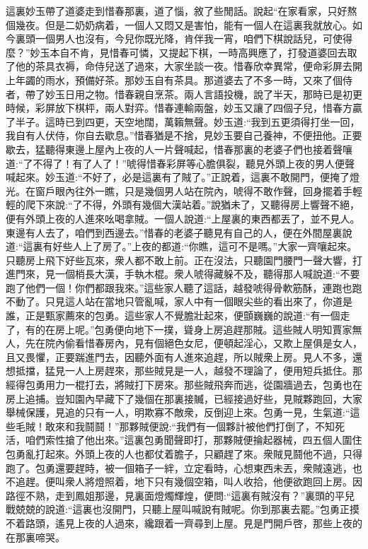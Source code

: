 \begin{parag}
    這裏妙玉帶了道婆走到惜春那裏，道了惱，敘了些閒話。說起“在家看家，只好熬個幾夜。但是二奶奶病着，一個人又悶又是害怕，能有一個人在這裏我就放心。如今裏頭一個男人也沒有，今兒你既光降，肯伴我一宵，咱們下棋說話兒，可使得麼？”妙玉本自不肯，見惜春可憐，又提起下棋，一時高興應了，打發道婆回去取了他的茶具衣褥，命侍兒送了過來，大家坐談一夜。惜春欣幸異常，便命彩屏去開上年蠲的雨水，預備好茶。那妙玉自有茶具。那道婆去了不多一時，又來了個侍者，帶了妙玉日用之物。惜春親自烹茶。兩人言語投機，說了半天，那時已是初更時候，彩屏放下棋枰，兩人對弈。惜春連輸兩盤，妙玉又讓了四個子兒，惜春方贏了半子。這時已到四更，天空地闊，萬籟無聲。妙玉道:“我到五更須得打坐一回，我自有人伏侍，你自去歇息。”惜春猶是不捨，見妙玉要自己養神，不便扭他。正要歇去，猛聽得東邊上屋內上夜的人一片聲喊起，惜春那裏的老婆子們也接着聲嚷道:“了不得了！有了人了！”唬得惜春彩屏等心膽俱裂，聽見外頭上夜的男人便聲喊起來。妙玉道:“不好了，必是這裏有了賊了。”正說着，這裏不敢開門，便掩了燈光。在窗戶眼內往外一瞧，只是幾個男人站在院內，唬得不敢作聲，回身擺着手輕輕的爬下來說:“了不得，外頭有幾個大漢站着。”說猶未了，又聽得房上響聲不絕，便有外頭上夜的人進來吆喝拿賊。一個人說道:“上屋裏的東西都丟了，並不見人。東邊有人去了，咱們到西邊去。”惜春的老婆子聽見有自己的人，便在外間屋裏說道:“這裏有好些人上了房了。”上夜的都道:“你瞧，這可不是嗎。”大家一齊嚷起來。只聽房上飛下好些瓦來，衆人都不敢上前。正在沒法，只聽園門腰門一聲大響，打進門來，見一個梢長大漢，手執木棍。衆人唬得藏躲不及，聽得那人喊說道:“不要跑了他們一個！你們都跟我來。”這些家人聽了這話，越發唬得骨軟筋酥，連跑也跑不動了。只見這人站在當地只管亂喊，家人中有一個眼尖些的看出來了，你道是誰，正是甄家薦來的包勇。這些家人不覺膽壯起來，便顫巍巍的說道:“有一個走了，有的在房上呢。”包勇便向地下一撲，聳身上房追趕那賊。這些賊人明知賈家無人，先在院內偷看惜春房內，見有個絕色女尼，便頓起淫心，又欺上屋俱是女人，且又畏懼，正要踹進門去，因聽外面有人進來追趕，所以賊衆上房。見人不多，還想抵擋，猛見一人上房趕來，那些賊見是一人，越發不理論了，便用短兵抵住。那經得包勇用力一棍打去，將賊打下房來。那些賊飛奔而逃，從園牆過去，包勇也在房上追捕。豈知園內早藏下了幾個在那裏接贓，已經接過好些，見賊夥跑回，大家舉械保護，見追的只有一人，明欺寡不敵衆，反倒迎上來。包勇一見，生氣道:“這些毛賊！敢來和我鬪鬪！”那夥賊便說:“我們有一個夥計被他們打倒了，不知死活，咱們索性搶了他出來。”這裏包勇聞聲即打，那夥賊便掄起器械，四五個人圍住包勇亂打起來。外頭上夜的人也都仗着膽子，只顧趕了來。衆賊見鬪他不過，只得跑了。包勇還要趕時，被一個箱子一絆，立定看時，心想東西未丟，衆賊遠逃，也不追趕。便叫衆人將燈照着，地下只有幾個空箱，叫人收拾，他便欲跑回上房。因路徑不熟，走到鳳姐那邊，見裏面燈燭輝煌，便問:“這裏有賊沒有？”裏頭的平兒戰兢兢的說道:“這裏也沒開門，只聽上屋叫喊說有賊呢。你到那裏去罷。”包勇正摸不着路頭，遙見上夜的人過來，纔跟着一齊尋到上屋。見是門開戶啓，那些上夜的在那裏啼哭。
\end{parag}


